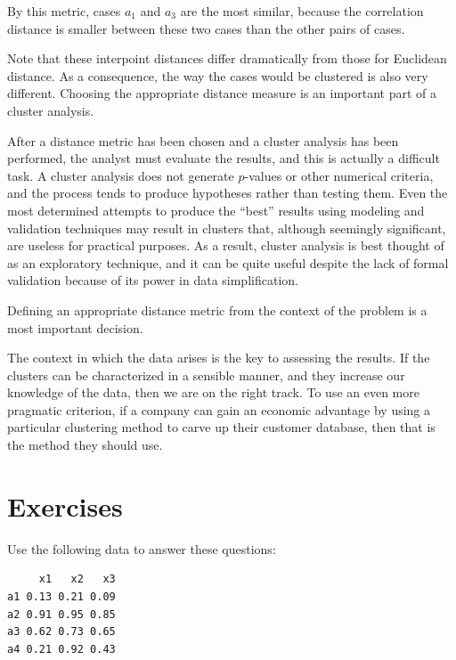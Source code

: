 \documentclass[
  letterpaper,
]{book}
\begin{document}
\noindent By this metric, cases \(a_1\) and \(a_3\) are the most
similar, because the correlation distance is smaller between these two
cases than the other pairs of cases.

Note that these interpoint distances differ dramatically from those for
Euclidean distance. As a consequence, the way the cases would be
clustered is also very different. Choosing the appropriate distance
measure is an important part of a cluster analysis.

After a distance metric has been chosen and a cluster analysis has been
performed, the analyst must evaluate the results, and this is actually a
difficult task. A cluster analysis does not generate \(p\)-values or
other numerical criteria, and the process tends to produce hypotheses
rather than testing them. Even the most determined attempts to produce
the ``best'' results using modeling and validation techniques may result
in clusters that, although seemingly significant, are useless for
practical purposes. As a result, cluster analysis is best thought of as
an exploratory technique, and it can be quite useful despite the lack of
formal validation because of its power in data simplification.

Defining an appropriate distance metric from the context of the problem
is a most important decision.

The context in which the data arises is the key to assessing the
results. If the clusters can be characterized in a sensible manner, and
they increase our knowledge of the data, then we are on the right track.
To use an even more pragmatic criterion, if a company can gain an
economic advantage by using a particular clustering method to carve up
their customer database, then that is the method they should use.

\hypertarget{exercises-5}{%
\section*{Exercises}\label{exercises-5}}


Use the following data to answer these questions:

\begin{verbatim}
     x1   x2   x3
a1 0.13 0.21 0.09
a2 0.91 0.95 0.85
a3 0.62 0.73 0.65
a4 0.21 0.92 0.43
\end{verbatim}
\end{document}
